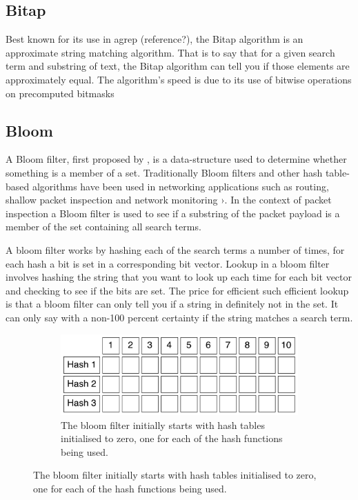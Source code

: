 \documentclass{article}
\begin{document}
\subsection{Bitap}

Best known for its use in agrep (reference?), the Bitap algorithm \cite{Baeza1992} is an approximate string matching algorithm. That is to say that for a given search term and substring of text, the Bitap algorithm can tell you if those elements are approximately equal. The algorithm's speed is due to its use of bitwise operations on precomputed bitmasks 

\subsection{Bloom}

A Bloom filter, first proposed by \cite{Bloom1970}, is a data-structure used to determine whether something is a member of a set. Traditionally Bloom filters and other hash table-based algorithms have been used in networking applications such as routing, shallow packet inspection and network monitoring \citep{Song2005}›. In the context of packet inspection a Bloom filter is used to see if a substring of the packet payload is a member of the set containing all search terms.

A bloom filter works by hashing each of the search terms a number of times, for each hash a bit is set in a corresponding bit vector. Lookup in a bloom filter involves hashing the string that you want to look up each time for each bit vector and checking to see if the bits are set. The price for efficient such efficient lookup is that a bloom filter can only tell you if a string in definitely not in the set. It can only say with a non-100 percent certainty if the string matches a search term.

\begin{figure}[hbt]
  \label{bloom-1}
  \centering
  
  \begin{subfigure}{\textwidth}
  \makeatletter
  \includegraphics[width=\textwidth]{images/bloom-1}
  \caption{The bloom filter initially starts with hash tables initialised to zero, one for each of the hash functions being used.}
  \end{subfigure}
\end{figure} 
\end{document}
